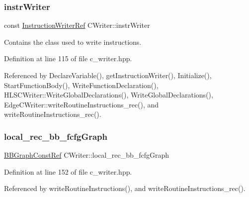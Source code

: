 \mbox{\label{classCWriter_af4be3a067b016eb97f15c89fa98088f3}} 
\subsubsection{\texorpdfstring{instr\+Writer}{instrWriter}}
{\footnotesize\ttfamily const \hyperlink{instruction__writer_8hpp_a40ea26c38a2909ba48f88f997144b260}{Instruction\+Writer\+Ref} C\+Writer\+::instr\+Writer\hspace{0.3cm}{\ttfamily [protected]}}



Contains the class used to write instructions. 



Definition at line 115 of file c\+\_\+writer.\+hpp.



Referenced by Declare\+Variable(), get\+Instruction\+Writer(), Initialize(), Start\+Function\+Body(), Write\+Function\+Declaration(), H\+L\+S\+C\+Writer\+::\+Write\+Global\+Declarations(), Write\+Global\+Declarations(), Edge\+C\+Writer\+::write\+Routine\+Instructions\+\_\+rec(), and write\+Routine\+Instructions\+\_\+rec().

\mbox{\label{classCWriter_a7066b65a022f2629ebf99da65b9cbcdb}} 
\subsubsection{\texorpdfstring{local\+\_\+rec\+\_\+bb\+\_\+fcfg\+Graph}{local\_rec\_bb\_fcfgGraph}}
{\footnotesize\ttfamily \hyperlink{basic__block_8hpp_ab66bdbde3a29e41d079d8a320af9c921}{B\+B\+Graph\+Const\+Ref} C\+Writer\+::local\+\_\+rec\+\_\+bb\+\_\+fcfg\+Graph\hspace{0.3cm}{\ttfamily [protected]}}



Definition at line 152 of file c\+\_\+writer.\+hpp.



Referenced by write\+Routine\+Instructions(), and write\+Routine\+Instructions\+\_\+rec().

